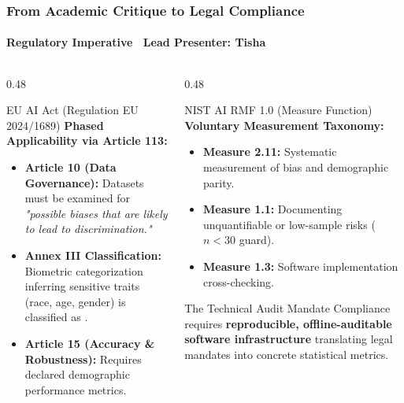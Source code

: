 \begin{frame}
  \frametitle{From Academic Critique to Legal Compliance}
  \framesubtitle{Regulatory Imperative \textbar\ Lead Presenter: Tisha}

  \begin{columns}[T]
    \begin{column}{0.48\textwidth}
      \begin{card}{EU AI Act (Regulation EU 2024/1689)}
        \scriptsize
        \textbf{Phased Applicability via Article 113:}
        \begin{itemize}\scriptsize
          \item \textbf{Article 10 (Data Governance):} Datasets must be examined for \textit{"possible biases that are likely to lead to discrimination."}
          \item \textbf{Annex III Classification:} Biometric categorization inferring sensitive traits (race, age, gender) is classified as .
          \item \textbf{Article 15 (Accuracy \& Robustness):} Requires declared demographic performance metrics.
        \end{itemize}
      \end{card}
    \end{column}

    \begin{column}{0.48\textwidth}
      \begin{card}{NIST AI RMF 1.0 (Measure Function)}
        \scriptsize
        \textbf{Voluntary Measurement Taxonomy:}
        \begin{itemize}\scriptsize
          \item \textbf{Measure 2.11:} Systematic measurement of bias and demographic parity.
          \item \textbf{Measure 1.1:} Documenting unquantifiable or low-sample risks ($n < 30$ guard).
          \item \textbf{Measure 1.3:} Software implementation cross-checking.
        \end{itemize}
      \end{card}

      \vspace{0.1cm}
      \begin{statcard}{The Technical Audit Mandate}
        \scriptsize Compliance requires \textbf{reproducible, offline-auditable software infrastructure} translating legal mandates into concrete statistical metrics.
      \end{statcard}
    \end{column}
  \end{columns}
\end{frame}
